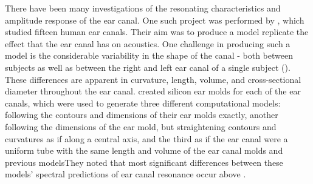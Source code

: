 There have been many investigations of the resonating characteristics and amplitude response of the ear canal.  One such project was performed by \cite{stinson:89}, which studied fifteen human ear canals.  Their aim was to produce a model \DIFdelbegin {}\DIFdelend \DIFaddbegin {}\DIFaddend replicate the effect that the ear canal has on acoustics.
One challenge in producing such a model is the considerable variability in the shape of the canal - both between subjects as well as between the right and left ear canal of a single subject (\cite{stinson:89}).  These differences are apparent in curvature, length, volume, and cross-sectional diameter throughout the ear canal.  \cite{stinson:89} created silicon ear molds for each of the ear canals, which were used to generate three different computational models: \DIFdelbegin {}\DIFdelend \DIFaddbegin {}\DIFaddend following the contours and dimensions of their ear molds exactly, another following the dimensions of the ear mold, but straightening contours and curvatures as if along a central axis, and the third as if the ear canal were a uniform tube with the same length and volume of the ear canal molds and previous models\DIFdelbegin {}\DIFdelend \DIFaddbegin {}\DIFaddend They noted that most significant differences between these models' spectral predictions of ear canal resonance occur above \DIFdelbegin {}\DIFdelend \DIFaddbegin {}\DIFaddend .

